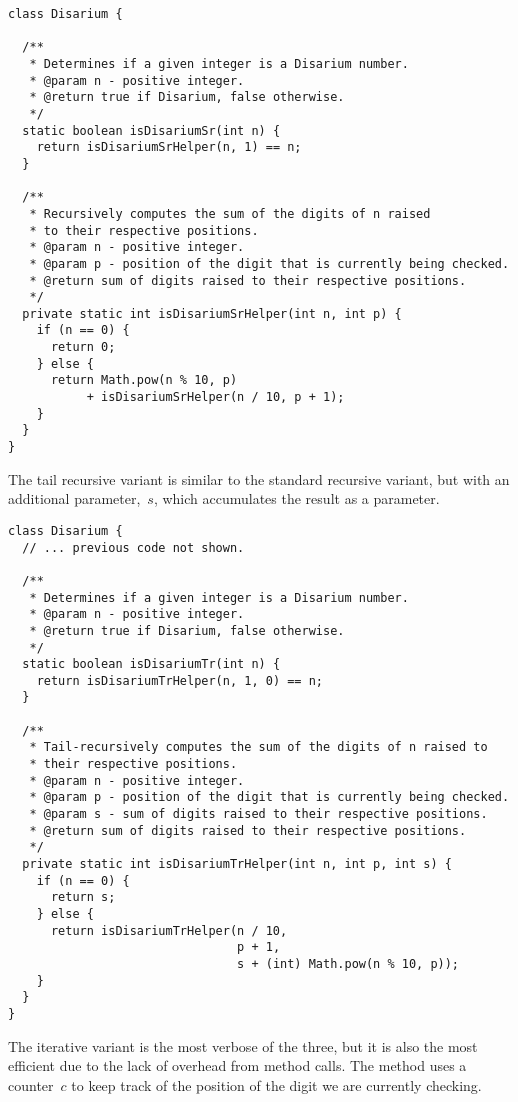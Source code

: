 \begin{lstlisting}[language=MyJava]
class Disarium {

  /**
   * Determines if a given integer is a Disarium number.
   * @param n - positive integer.
   * @return true if Disarium, false otherwise.
   */
  static boolean isDisariumSr(int n) {
    return isDisariumSrHelper(n, 1) == n;
  }

  /**
   * Recursively computes the sum of the digits of n raised 
   * to their respective positions.
   * @param n - positive integer.
   * @param p - position of the digit that is currently being checked.
   * @return sum of digits raised to their respective positions.
   */
  private static int isDisariumSrHelper(int n, int p) {
    if (n == 0) { 
      return 0;
    } else { 
      return Math.pow(n % 10, p) 
           + isDisariumSrHelper(n / 10, p + 1); 
    }
  }
}
\end{lstlisting}

The tail recursive variant is similar to the standard recursive variant, but with an additional parameter,~$s$, which accumulates the result as a parameter.

\begin{lstlisting}[language=MyJava]
class Disarium {
  // ... previous code not shown.

  /**
   * Determines if a given integer is a Disarium number.
   * @param n - positive integer.
   * @return true if Disarium, false otherwise.
   */
  static boolean isDisariumTr(int n) {
    return isDisariumTrHelper(n, 1, 0) == n;
  }

  /**
   * Tail-recursively computes the sum of the digits of n raised to 
   * their respective positions.
   * @param n - positive integer.
   * @param p - position of the digit that is currently being checked.
   * @param s - sum of digits raised to their respective positions.
   * @return sum of digits raised to their respective positions.
   */
  private static int isDisariumTrHelper(int n, int p, int s) {
    if (n == 0) { 
      return s; 
    } else { 
      return isDisariumTrHelper(n / 10, 
                                p + 1, 
                                s + (int) Math.pow(n % 10, p)); 
    }
  }
}
\end{lstlisting}

The iterative variant is the most verbose of the three, but it is also the most efficient due to the lack of overhead from method calls.
The method uses a counter~$c$ to keep track of the position of the digit we are currently checking.

